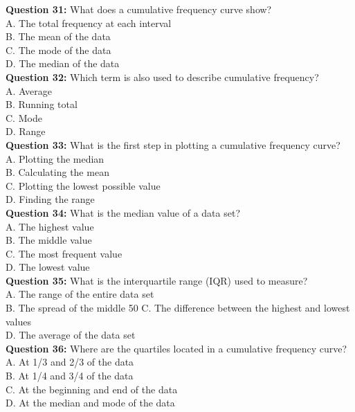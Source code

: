 \documentclass{article}
\begin{document}
\textbf{Question 31:} What does a cumulative frequency curve show? \\
A. The total frequency at each interval \\
B. The mean of the data \\
C. The mode of the data \\
D. The median of the data \\

\textbf{Question 32:} Which term is also used to describe cumulative frequency? \\
A. Average \\
B. Running total \\
C. Mode \\
D. Range \\

\textbf{Question 33:} What is the first step in plotting a cumulative frequency curve? \\
A. Plotting the median \\
B. Calculating the mean \\
C. Plotting the lowest possible value \\
D. Finding the range \\

\textbf{Question 34:} What is the median value of a data set? \\
A. The highest value \\
B. The middle value \\
C. The most frequent value \\
D. The lowest value \\

\textbf{Question 35:} What is the interquartile range (IQR) used to measure? \\
A. The range of the entire data set \\
B. The spread of the middle 50%
C. The difference between the highest and lowest values \\
D. The average of the data set \\

\textbf{Question 36:} Where are the quartiles located in a cumulative frequency curve? \\
A. At 1/3 and 2/3 of the data \\
B. At 1/4 and 3/4 of the data \\
C. At the beginning and end of the data \\
D. At the median and mode of the data \\
\end{document}
